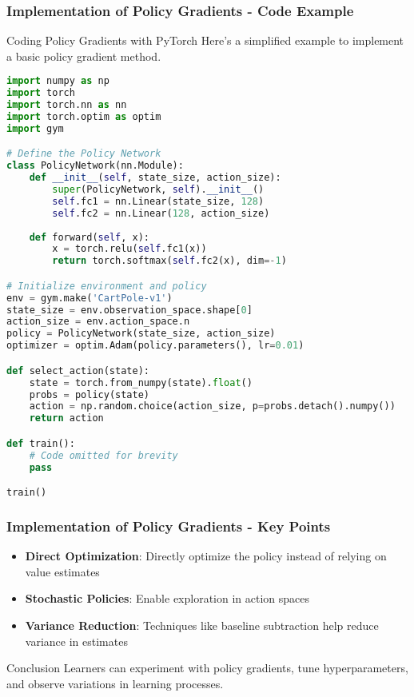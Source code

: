 \documentclass[aspectratio=169]{beamer}
\begin{document}
\begin{frame}[fragile]
    \frametitle{Implementation of Policy Gradients - Code Example}
    \begin{block}{Coding Policy Gradients with PyTorch}
    Here’s a simplified example to implement a basic policy gradient method.
    \begin{lstlisting}[language=Python]
import numpy as np
import torch
import torch.nn as nn
import torch.optim as optim
import gym

# Define the Policy Network
class PolicyNetwork(nn.Module):
    def __init__(self, state_size, action_size):
        super(PolicyNetwork, self).__init__()
        self.fc1 = nn.Linear(state_size, 128)
        self.fc2 = nn.Linear(128, action_size)
        
    def forward(self, x):
        x = torch.relu(self.fc1(x))
        return torch.softmax(self.fc2(x), dim=-1)

# Initialize environment and policy
env = gym.make('CartPole-v1')
state_size = env.observation_space.shape[0]
action_size = env.action_space.n
policy = PolicyNetwork(state_size, action_size)
optimizer = optim.Adam(policy.parameters(), lr=0.01)

def select_action(state):
    state = torch.from_numpy(state).float()
    probs = policy(state)
    action = np.random.choice(action_size, p=probs.detach().numpy())
    return action

def train():
    # Code omitted for brevity
    pass

train()
    \end{lstlisting}
    \end{block}
\end{frame}

\begin{frame}[fragile]
    \frametitle{Implementation of Policy Gradients - Key Points}
    \begin{itemize}
        \item \textbf{Direct Optimization}: Directly optimize the policy instead of relying on value estimates
        \item \textbf{Stochastic Policies}: Enable exploration in action spaces
        \item \textbf{Variance Reduction}: Techniques like baseline subtraction help reduce variance in estimates
    \end{itemize}
    \begin{block}{Conclusion}
        Learners can experiment with policy gradients, tune hyperparameters, and observe variations in learning processes.
    \end{block}
\end{frame}
\end{document}
